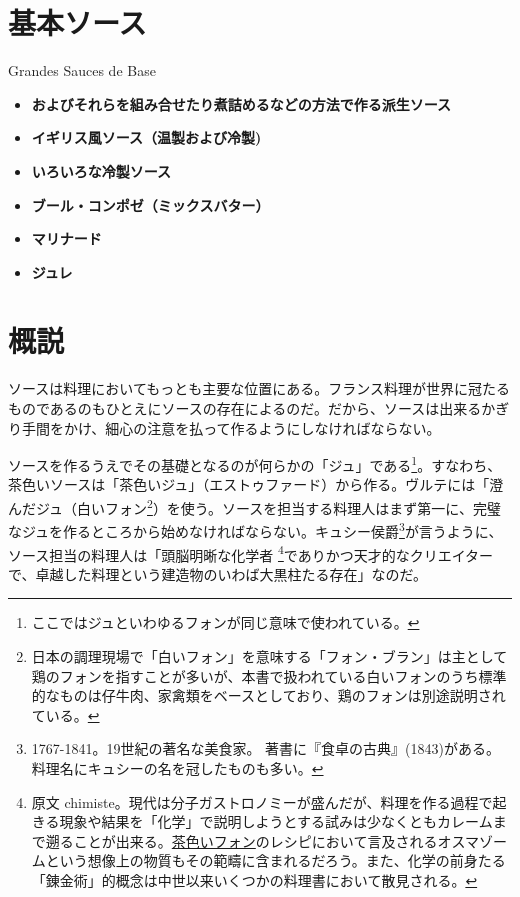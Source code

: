 \begin{main}
\newpage

\hypertarget{section-grandes-sauces-de-base}{%
\section{基本ソース}\label{section-grandes-sauces-de-base}}

\begin{frsecenv}

Grandes Sauces de Base

\end{frsecenv}


\begin{itemize}
\item
  \textbf{およびそれらを組み合せたり煮詰めるなどの方法で作る派生ソース}
\item
  \textbf{イギリス風ソース（温製および冷製)}
\item
  \textbf{いろいろな冷製ソース}
\item
  \textbf{ブール・コンポゼ（ミックスバター）}
\item
  \textbf{マリナード}
\item
  \textbf{ジュレ}
\end{itemize}

\hypertarget{osbservation-sur-la-sauce}{%
\section{概説}\label{osbservation-sur-la-sauce}}

ソースは料理においてもっとも主要な位置にある。フランス料理が世界に冠たるものであるのもひとえにソースの存在によるのだ。だから、ソースは出来るかぎり手間をかけ、細心の注意を払って作るようにしなければならない。

ソースを作るうえでその基礎となるのが何らかの「ジュ」である\footnote{ここではジュといわゆるフォンが同じ意味で使われている。}。すなわち、茶色いソースは「茶色いジュ」（エストゥファード）から作る。ヴルテには「澄んだジュ（白いフォン\footnote{日本の調理現場で「白いフォン」を意味する「フォン・ブラン」は主として鶏のフォンを指すことが多いが、本書で扱われている白いフォンのうち標準的なものは仔牛肉、家禽類をベースとしており、鶏のフォンは別途説明されている。}）を使う。ソースを担当する料理人はまず第一に、完璧なジュを作るところから始めなければならない。キュシー侯爵\footnote{1767-1841。19世紀の著名な美食家。
  著書に『食卓の古典』(1843)がある。料理名にキュシーの名を冠したものも多い。}が言うように、ソース担当の料理人は「頭脳明晰な化学者
\footnote{原文
  chimiste。現代は分子ガストロノミーが盛んだが、料理を作る過程で起きる現象や結果を「化学」で説明しようとする試みは少なくともカレームまで遡ることが出来る。\protect\hyperlink{fonds-brun}{茶色いフォン}のレシピにおいて言及されるオスマゾームという想像上の物質もその範疇に含まれるだろう。また、化学の前身たる「錬金術」的概念は中世以来いくつかの料理書において散見される。}でありかつ天才的なクリエイターで、卓越した料理という建造物のいわば大黒柱たる存在」なのだ。


\end{main}
